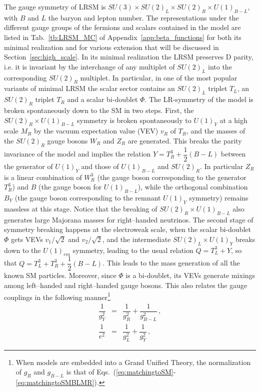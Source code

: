 \documentclass[11pt]{article}
\begin{document}
The gauge symmetry of LRSM  is $SU(3)\times SU(2)_{L} \times {SU}(2)_R \times {U(1)}_{B-L}$, with $B$ and $L$ the baryon and lepton number. The representations under the different gauge groups of the fermions and scalars contained in the model are listed in Tab.~\ref{tb:LRSM_MC} of Appendix~\ref{app:beta_functions} for both its minimal realization and for various extension that will be discussed in Section~\ref{sec:high_scale}. 
In its minimal realization the LRSM preserves D parity, i.e. it is invariant by the interchange of any multiplet of $SU(2)_L$ into the corresponding  $SU(2)_R$ multiplet. In particular, in one of the most popular variants of minimal LRSM the scalar sector
contains an $SU(2)_L$ triplet $T_L$, an $SU(2)_R$ triplet
$T_R$ and a scalar bi-doublet $\Phi$. The LR-symmetry of the model is broken spontaneously down to the SM in two steps. First, the $SU(2)_R\times U(1)_{B-L}$ symmetry is broken spontaneously to $U(1)_{Y}$ at a high scale $M_R$ by the vacuum expectation value (VEV) $v_R$ of $T_R$, and the masses of the $SU(2)_R$ gauge bosons $W_R$ and $Z_R$ are generated. This breaks the parity invariance of the model and implies the relation $Y = T^3_R + \dfrac{1}{2}(B-L)$ between the generator of  $U(1)_Y$ and those of $U(1)_{B-L}$ and $SU(2)_R$.
In particular $Z_{R}$ is a linear combination of $W^3_R$ (the gauge boson corresponding to the generator
$T^3_R$) and $B$ (the gauge boson for $U(1)_{B-L}$), while the orthogonal
combination $B_Y$ (the gauge boson corresponding to the remnant $U(1)_Y$ symmetry) remains massless at this stage. Notice that the breaking of
$SU(2)_R\times U(1)_{B-L}$ also generates large Majorana masses for right--handed neutrinos.
The second stage of symmetry breaking happens at the electroweak scale, when the scalar
bi-doublet $\Phi$ gets VEVs $v_1/\sqrt{2}$ and $v_2/\sqrt{2}$, and the intermediate $SU(2)_{L}\times U(1)_Y$ breaks down to
the $U(1)_{em}$ symmetry, leading to the usual relation $Q = T^3_L + Y$, so that $Q= T^3_L + T^3_R +  \dfrac{1}{2}(B-L)$. This leads to the mass generation
of all the known SM particles. Moreover, since $\Phi$ is a bi-doublet, its VEVs generate mixings among left--handed and 
right--handed gauge bosons. This also relates the gauge couplings in the following manner\footnote{When models are embedded into a Grand Unified Theory, the normalization of $g_R$ and $g_{B-L}$ is that of Eqs.~(\ref{eq:matchingtoSM}-\ref{eq:matchingtoSMBLMR}).}
\begin{eqnarray}
\dfrac{1}{g_{Y}^2} &=& \dfrac{1}{g^2_R} + \dfrac{1}{g^2_{B-L}} \,,\\
\dfrac{1}{e^2} &=& \dfrac{1}{g^2_L} + \dfrac{1}{g^2_Y} \,,
\end{eqnarray}
\end{document}

